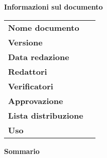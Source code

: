 
\begin{center}
	\textbf{\Large Informazioni sul documento} \\[0.5cm]
	\begin{longtable}{ l | p{6cm} }
		\textbf{Nome documento} & \documentName \\
		\textbf{Versione} & {\documentVersion} \\
		\textbf{Data redazione} & {\documentDate} \\
		\textbf{Redattori} & \parbox{\textwidth}{\documentEditors} \\
		\textbf{Verificatori} & \parbox{\textwidth}{\documentVerifiers} \\
		\textbf{Approvazione} & \parbox{\textwidth}{\documentApprovers} \\
		\textbf{Lista distribuzione} & \parbox{\textwidth}{\documentDistributionList} \\
		\textbf{Uso} & \parbox{\textwidth}{\documentUsage} 
		\\
	\end{longtable}
	\vspace{0.5cm}
\textbf{\Large Sommario} \\[0.4cm]
\end{center}